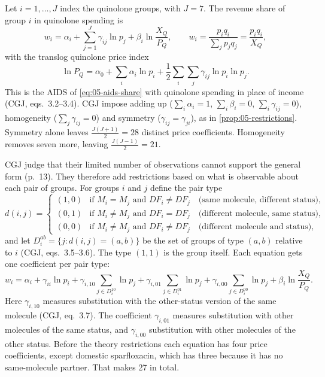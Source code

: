  Let $i = 1, \ldots, J$ index the quinolone groups, with $J = 7$. The revenue share of group
$i$ in quinolone spending is
\begin{equation}\label{eq:05-cgj-lower}
w_i = \alpha_i + \sum_{j=1}^{J}\gamma_{ij}\ln p_j + \beta_i\ln\frac{X_Q}{P_Q},
\qquad w_i = \frac{p_iq_i}{\sum_{j}p_jq_j} = \frac{p_iq_i}{X_Q},
\end{equation}
with the translog quinolone price index
\begin{equation}\label{eq:05-cgj-translog}
\ln P_Q = \alpha_0 + \sum_{i}\alpha_i\ln p_i + \frac{1}{2}\sum_{i}\sum_{j}\gamma_{ij}\ln p_i\ln p_j .
\end{equation}
This is the AIDS of \eqref{eq:05-aids-share} with quinolone spending in place of income (CGJ, eqs.~3.2--3.4). CGJ
impose adding up ($\sum_i\alpha_i = 1$, $\sum_i\beta_i = 0$, $\sum_i\gamma_{ij} = 0$), homogeneity
($\sum_j\gamma_{ij} = 0$) and symmetry ($\gamma_{ij} = \gamma_{ji}$), as in \cref{prop:05-restrictions}. Symmetry alone
leaves $\frac{J(J+1)}{2} = 28$ distinct price coefficients. Homogeneity removes seven more, leaving
$\frac{J(J-1)}{2} = 21$.

 CGJ judge that their limited number of observations cannot support the general form
(p.~13). They therefore add restrictions based on what is observable about each pair of groups. For groups $i$ and $j$ define the pair type
\begin{equation}\label{eq:05-cgj-pairtype}
d(i,j) =
\begin{cases}
(1,0) & \text{if } M_i = M_j \text{ and } DF_i \neq DF_j \quad\text{(same molecule, different status)},\\
(0,1) & \text{if } M_i \neq M_j \text{ and } DF_i = DF_j \quad\text{(different molecule, same status)},\\
(0,0) & \text{if } M_i \neq M_j \text{ and } DF_i \neq DF_j \quad\text{(different molecule and status)},
\end{cases}
\end{equation}
and let $D_i^{ab} = \{j : d(i,j) = (a,b)\}$ be the set of groups of type $(a,b)$ relative to $i$ (CGJ, eqs.~3.5--3.6).
The type $(1,1)$ is the group itself. Each equation gets one coefficient per pair type:
\begin{equation}\label{eq:05-cgj-lower-restricted}
w_i = \alpha_i + \gamma_{ii}\ln p_i + \gamma_{i,10}\sum_{j\in D_i^{10}}\ln p_j + \gamma_{i,01}\sum_{j\in D_i^{01}}\ln p_j
+ \gamma_{i,00}\sum_{j\in D_i^{00}}\ln p_j + \beta_i\ln\frac{X_Q}{P_Q}.
\end{equation}
Here $\gamma_{i,10}$ measures substitution with the other-status version of the same molecule (CGJ, eq.~3.7). The
coefficient $\gamma_{i,01}$ measures substitution with other molecules of the same status, and $\gamma_{i,00}$
substitution with other molecules of the other status. Before the theory restrictions each equation has four
price coefficients, except domestic sparfloxacin, which has three because it has no same-molecule partner. That
makes 27 in total.


